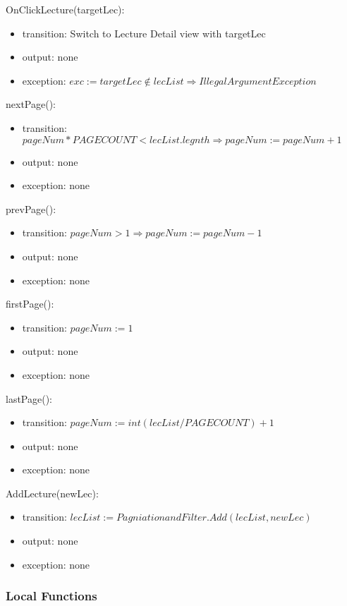 \documentclass[12pt, titlepage]{article}
\begin{document}
\noindent OnClickLecture(targetLec):
\begin{itemize}
\item transition: Switch to Lecture Detail view with targetLec
\item output: none
\item exception: $exc := targetLec \notin lecList \Rightarrow IllegalArgument Exception$
\end{itemize}

\noindent nextPage():
\begin{itemize}
\item transition: $pageNum * PAGECOUNT < lecList.legnth \Rightarrow pageNum := pageNum + 1$
\item output: none
\item exception: none
\end{itemize}

\noindent prevPage():
\begin{itemize}
\item transition: $pageNum > 1 \Rightarrow pageNum := pageNum - 1$
\item output: none
\item exception: none
\end{itemize}

\noindent firstPage():
\begin{itemize}
\item transition: $pageNum := 1$
\item output: none
\item exception: none
\end{itemize}

\noindent lastPage():
\begin{itemize}
\item transition: $pageNum := int(lecList/PAGECOUNT) + 1$
\item output: none
\item exception: none
\end{itemize}

\noindent AddLecture(newLec):
\begin{itemize}
\item transition: $lecList := PagniationandFilter.Add(lecList, newLec)$
\item output: none
\item exception: none
\end{itemize}
\subsubsection{Local Functions}
\end{document}
